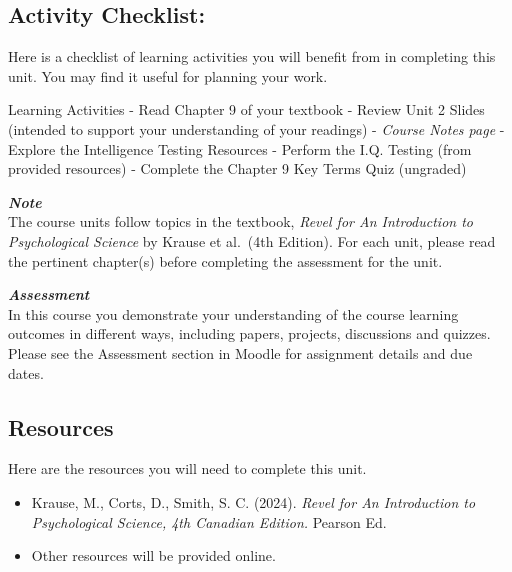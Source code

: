 \documentclass[
]{book}
\providecommand{\tightlist}{%
  \setlength{\itemsep}{0pt}\setlength{\parskip}{0pt}}
\begin{document}
\hypertarget{activity-checklist-1}{%
\subsection*{Activity Checklist:}\label{activity-checklist-1}}

Here is a checklist of learning activities you will benefit from in completing this unit. You may find it useful for planning your work.

\begin{reflect}
{Learning Activities}
- Read Chapter 9 of your textbook
- Review Unit 2 Slides (intended to support your understanding of your readings) - \emph{Course Notes page}
- Explore the Intelligence Testing Resources
- Perform the I.Q. Testing (from provided resources)
- Complete the Chapter 9 Key Terms Quiz (ungraded)
\end{reflect}

\begin{caution}
\textbf{\emph{Note}}\\
The course units follow topics in the textbook, \emph{Revel for An Introduction to Psychological Science} by Krause et al.~(4th Edition). For each unit, please read the pertinent chapter(s) before completing the assessment for the unit.
\end{caution}

\begin{assessment}
\textbf{\emph{Assessment}}\\
In this course you demonstrate your understanding of the course learning outcomes in different ways, including papers, projects, discussions and quizzes. Please see the Assessment section in Moodle for assignment details and due dates.
\end{assessment}

\hypertarget{resources-1}{%
\subsection*{Resources}\label{resources-1}}

Here are the resources you will need to complete this unit.

\begin{itemize}
\tightlist
\item
  Krause, M., Corts, D., Smith, S. C. (2024). \emph{Revel for An Introduction to Psychological Science, 4th Canadian Edition.} Pearson Ed.\\
\item
  Other resources will be provided online.
\end{itemize}
\end{document}
